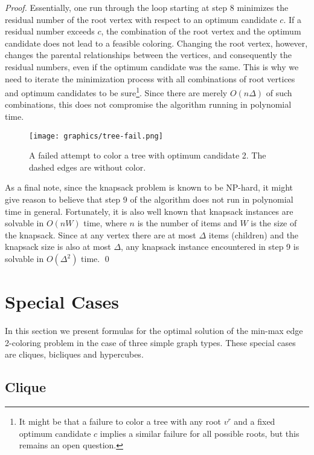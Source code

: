 \documentclass[runningheads, a4paper]{llncs}
\begin{document}
\begin{proof}
Essentially, one run through the loop starting at step 8 minimizes the residual number of the root vertex with respect to an optimum candidate $c$. If a residual number exceeds $c$, the combination of the root vertex and the optimum candidate does not lead to a feasible coloring. Changing the root vertex, however, changes the parental relationships between the vertices, and consequently the residual numbers, even if the optimum candidate was the same. This is why we need to iterate the minimization process with all combinations of root vertices and optimum candidates to be sure\footnote{It might be that a failure to color a tree with any root $v^r$ and a fixed optimum candidate $c$ implies a similar failure for all possible roots, but this remains an open question.}. Since there are merely $O(n\Delta)$ of such combinations, this does not compromise the algorithm running in polynomial time.

\begin{figure}[htb]
\centering \texttt{[image: graphics/tree-fail.png]}
\caption{A failed attempt to color a tree with optimum candidate 2. The dashed edges are without color.}\label{img:tree-fail}
\end{figure}

As a final note, since the knapsack problem is known to be NP-hard, it might give reason to believe that step 9 of the algorithm does not run in polynomial time in general. Fortunately, it is also well known that knapsack instances are solvable in $O(nW)$ time, where $n$ is the number of items and $W$ is the size of the knapsack. Since at any vertex there are at most $\Delta$ items (children) and the knapsack size is also at most $\Delta$, any knapsack instance encountered in step 9 is solvable in $O(\Delta^2)$ time. \qed

\end{proof}


\section{Special Cases}\label{sect:special}

In this section we present formulas for the optimal solution of the min-max edge 2-coloring problem in the case of three simple graph types. These special cases are cliques, bicliques and hypercubes.


\subsection{Clique}\label{ssect:clique}
\end{document}

